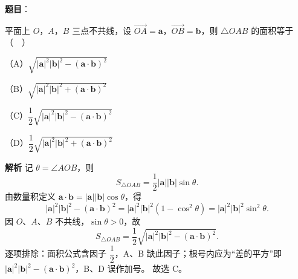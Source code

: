 \begin{answer}

\textbf{题目}：

平面上 $O$，$A$，$B$ 三点不共线，设 $\overrightarrow{OA}=\boldsymbol a$，$\overrightarrow{OB}=\boldsymbol b$，则 $\triangle OAB$ 的面积等于（　）

（A）$\sqrt{|\boldsymbol a|^2|\boldsymbol b|^2-(\boldsymbol a\cdot\boldsymbol b)^2}$

（B）$\sqrt{|\boldsymbol a|^2|\boldsymbol b|^2+(\boldsymbol a\cdot\boldsymbol b)^2}$

（C）$\dfrac12\sqrt{|\boldsymbol a|^2|\boldsymbol b|^2-(\boldsymbol a\cdot\boldsymbol b)^2}$

（D）$\dfrac12\sqrt{|\boldsymbol a|^2|\boldsymbol b|^2+(\boldsymbol a\cdot\boldsymbol b)^2}$

\textbf{解析}
记 $\theta=\angle AOB$，则
\nopagebreak[4]
\[S_{\triangle OAB}=\frac12|\boldsymbol a||\boldsymbol b|\sin\theta.\]
由数量积定义 $\boldsymbol a\cdot\boldsymbol b=|\boldsymbol a||\boldsymbol b|\cos\theta$，得
\nopagebreak[4]
\[|\boldsymbol a|^2|\boldsymbol b|^2-(\boldsymbol a\cdot\boldsymbol b)^2
=|\boldsymbol a|^2|\boldsymbol b|^2\left(1-\cos^2\theta\right)
=|\boldsymbol a|^2|\boldsymbol b|^2\sin^2\theta.\]
因 $O$、$A$、$B$ 不共线，$\sin\theta>0$，故
\nopagebreak[4]
\[S_{\triangle OAB}=\frac12\sqrt{|\boldsymbol a|^2|\boldsymbol b|^2-(\boldsymbol a\cdot\boldsymbol b)^2}.\]
逐项排除：面积公式含因子 $\dfrac12$，A、B 缺此因子；根号内应为“差的平方”即 $|\boldsymbol a|^2|\boldsymbol b|^2-(\boldsymbol a\cdot\boldsymbol b)^2$，B、D 误作加号。
故选 C。


\end{answer}
